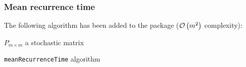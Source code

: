 \begin{frame} \frametitle{Mean recurrence time}

    The following algorithm has been added to the package (\(\mathcal{O}\left(m^2\right)\) 
    complexity):

    \begin{algorithm}[H]
    \begin{algorithmic}[1]
    \REQUIRE $P_{m \times m}$ a stochastic matrix
    \NEWLINE
        \ENDIF
        \ENDFOR
    \ENDFOR
    \end{algorithmic}
    \caption{\texttt{meanRecurrenceTime} algorithm}
    \label{alg:mrt}
    \end{algorithm}

\end{frame}

